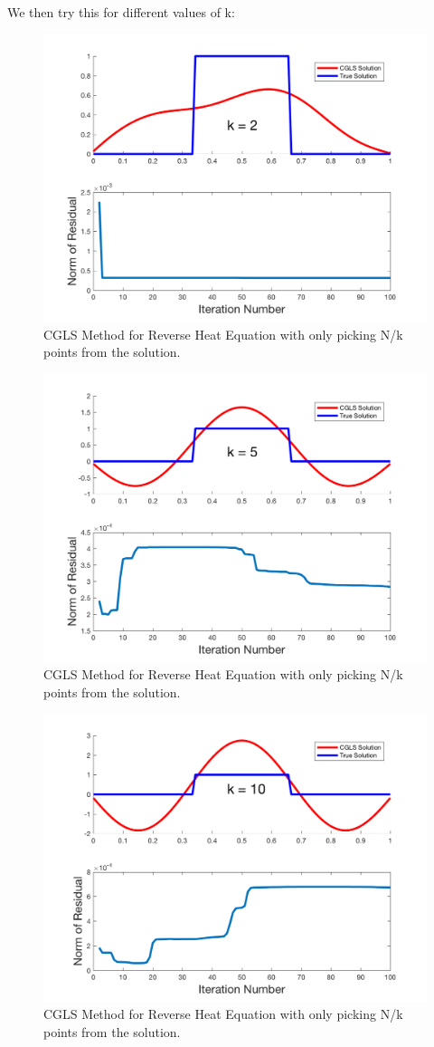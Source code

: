\documentclass{article}
\begin{document}
We then try this for different values of k:

\begin{figure}[H]
    \centerline{
    \includegraphics[height = 6 cm]{downsample_k2.png}
    }
    \caption{\label{fig:k2} CGLS Method for Reverse Heat Equation with only picking N/k points from the solution.}
\end{figure}

\begin{figure}[H]
    \centerline{
    \includegraphics[height = 6 cm]{downsample_k5.png}
    }
    \caption{\label{fig:k5} CGLS Method for Reverse Heat Equation with only picking N/k points from the solution.}
\end{figure}

\begin{figure}[H]
    \centerline{
    \includegraphics[height = 6 cm]{downsample_k10.png}
    }
    \caption{\label{fig:k10} CGLS Method for Reverse Heat Equation with only picking N/k points from the solution.}
\end{figure}
\end{document}
